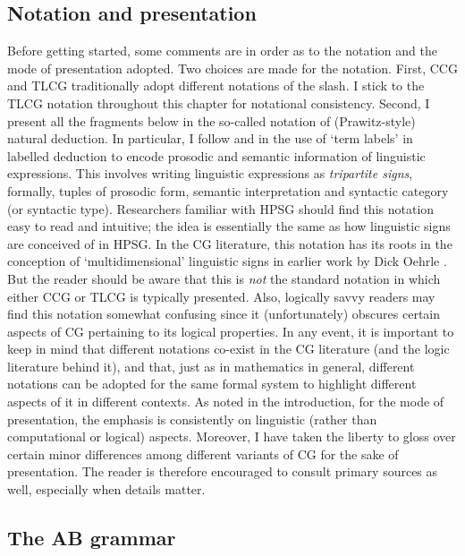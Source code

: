 \documentclass[output=paper]{langsci/langscibook}
\begin{document}
\subsection{Notation and presentation }

Before getting started, some comments are in order as to the notation
and the mode of presentation adopted. Two choices are made for the
notation. First, CCG and TLCG traditionally adopt different notations
of the slash. I stick to the TLCG notation throughout this chapter for
notational consistency. Second, I present all the fragments below in
the so-called  notation of (Prawitz-style)
natural deduction. In particular, I follow \citet{oehrle1994} and
\citet{Morrill94a-u} in the use of `term labels' in labelled deduction
to encode prosodic and semantic information of linguistic expressions.
This involves writing linguistic expressions as \emph{tripartite
signs}, formally, tuples of prosodic form, semantic interpretation and
syntactic category (or syntactic type). Researchers familiar with HPSG
should find this notation easy to read and intuitive; the idea is
essentially the same as how linguistic signs are conceived of in HPSG.
In the CG literature, this notation has its roots in the conception of
`multidimensional' linguistic signs in earlier work by Dick Oehrle
\citep{oehrle88}. But the reader should be aware that this is
\emph{not} the standard notation in which either CCG or TLCG is
typically presented. Also, logically savvy readers may find this
notation somewhat confusing since it (unfortunately) obscures certain
aspects of CG pertaining to its logical properties. In any event, it
is important to keep in mind that different notations co-exist in the
CG literature (and the logic literature behind it), and that, just as
in mathematics in general, different notations can be adopted for the
same formal system to highlight different aspects of it in different
contexts. As noted in the introduction,  for the mode of presentation, the emphasis is consistently
on linguistic (rather than computational or logical) aspects.
Moreover, I have taken the liberty to gloss over certain
minor differences among different variants of CG for the sake of
presentation. The reader is therefore encouraged
to consult primary sources as well, especially when details matter.


\subsection{The AB grammar \label{ab}}
\end{document}
